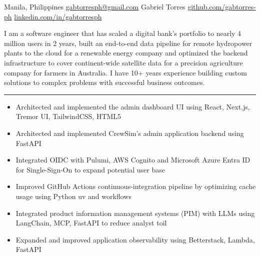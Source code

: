\resumeheader
  {Manila, Philippines}
  {\href{mailto:gabtorresph@gmail.com}{gabtorresph@gmail.com}}
  {Gabriel Torres}
  {\href{https://github.com/gabtorres-ph}{github.com/gabtorres-ph}}
  {\href{https://www.linkedin.com/in/gabtorresph/}{linkedin.com/in/gabtorresph}}

\vspace{0.55em}

I am a software engineer that has scaled a digital bank's portfolio to nearly 4 million users in 2 years, built an end-to-end data pipeline for remote hydropower plants to the cloud for a renewable energy company and optimized the backend infrastructure to cover continent-wide satellite data for a precision agriculture company for farmers in Australia. I have 10+ years experience building custom solutions to complex problems with successful business outcomes.

\vspace{0.25em}
\color{rulegray}\hrule\color{black}

\begin{itemize}
  \item Architected and implemented the admin dashboard UI using React, Next.js, Tremor UI, TailwindCSS, HTML5
  \item Architected and implemented CrewSim's admin application backend using FastAPI
\end{itemize}

\begin{itemize}
  \item Integrated OIDC with Pulumi, AWS Cognito and Microsoft Azure Entra ID for Single-Sign-On to expand potential user base
  \item Improved GitHub Actions continuous-integration pipeline by optimizing cache usage using Python uv and workflows
  \item Integrated product information management systems (PIM) with LLMs using LangChain, MCP, FastAPI to reduce analyst toil
  \item Expanded and improved application observability using Betterstack, Lambda, FastAPI
\end{itemize}

